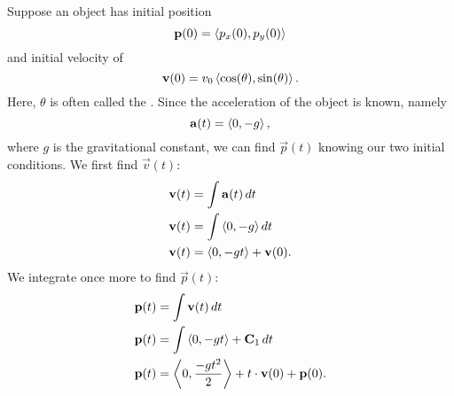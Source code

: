\documentclass{ximera}
\begin{document}
Suppose an object has initial position
\[
\mathbf{p}(0) = \left\langle p_x(0),p_y(0)\right\rangle
\]
and initial velocity of
\[
\mathbf{v}(0) = v_0\left\langle \cos(\theta),\sin(\theta)\right\rangle.
\]
Here, $\theta$ is often called the .  Since
the acceleration of the object is known, namely
\[
\mathbf{a}(t) =\left\langle 0,-g\right\rangle,
\]
where $g$ is the gravitational constant, we can find $\vec{p}(t)$ knowing
our two initial conditions. We first find $\vec{v}(t)$:
\begin{align*}
  \mathbf{v}(t) &= \int \mathbf{a}(t) \mathop{}\!d t\\
  \mathbf{v}(t) &= \int \left\langle 0,-g\right\rangle \mathop{}\!d t\\
  \mathbf{v}(t) &= \left\langle 0,-gt\right\rangle + \mathbf{v}(0).
\end{align*}
We integrate once more to find $\vec{p}(t)$:
\begin{align*}
\mathbf{p}(t) &= \int \mathbf{v}(t)\mathop{}\!d t \\
\mathbf{p}(t) &= \int \left\langle 0,-gt\right\rangle + \mathbf C_1 \mathop{}\!d t\\
\mathbf{p}(t) &= \left\langle 0, \frac{-gt^2}{2}\right\rangle +t\cdot \mathbf{v}(0)+ \mathbf{p}(0).
\end{align*}
\end{document}
